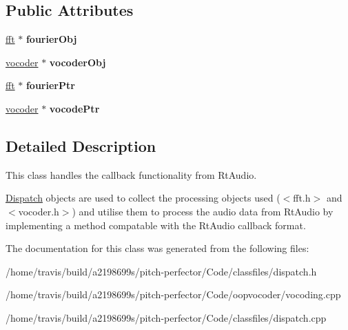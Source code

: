 \subsection*{Public Attributes}
\begin{DoxyCompactItemize}
\item 
\hypertarget{classdispatch_a7b449abb93c0499530bec56afe866f5a}{\hyperlink{classfft}{fft} $\ast$ {\bfseries fourier\-Obj}}\label{classdispatch_a7b449abb93c0499530bec56afe866f5a}

\item 
\hypertarget{classdispatch_a7ccec21b2dce1224744ccaa8d1cafee5}{\hyperlink{classvocoder}{vocoder} $\ast$ {\bfseries vocoder\-Obj}}\label{classdispatch_a7ccec21b2dce1224744ccaa8d1cafee5}

\item 
\hypertarget{classdispatch_a756411664d900bf1cf31e7626c57a4d4}{\hyperlink{classfft}{fft} $\ast$ {\bfseries fourier\-Ptr}}\label{classdispatch_a756411664d900bf1cf31e7626c57a4d4}

\item 
\hypertarget{classdispatch_ac5c5c76c34783dfc1a0e29935272e99f}{\hyperlink{classvocoder}{vocoder} $\ast$ {\bfseries vocode\-Ptr}}\label{classdispatch_ac5c5c76c34783dfc1a0e29935272e99f}

\end{DoxyCompactItemize}


\subsection{Detailed Description}
This class handles the callback functionality from Rt\-Audio. 

\hyperlink{classDispatch}{Dispatch} objects are used to collect the processing objects used ($<$fft.\-h$>$ and $<$vocoder.\-h$>$) and utilise them to process the audio data from Rt\-Audio by implementing a method compatable with the Rt\-Audio callback format. 

The documentation for this class was generated from the following files\-:\begin{DoxyCompactItemize}
\item 
/home/travis/build/a2198699s/pitch-\/perfector/\-Code/classfiles/dispatch.\-h\item 
/home/travis/build/a2198699s/pitch-\/perfector/\-Code/oopvocoder/vocoding.\-cpp\item 
/home/travis/build/a2198699s/pitch-\/perfector/\-Code/classfiles/dispatch.\-cpp\end{DoxyCompactItemize}
